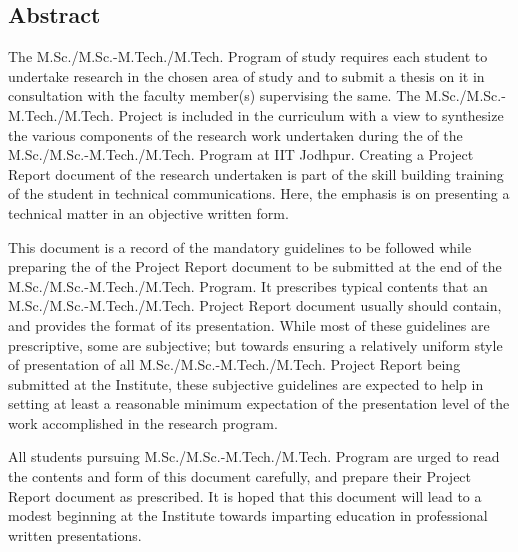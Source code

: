 \begin{flushright}
\huge{\section*{Abstract}}
\end{flushright}
The M.Sc./M.Sc.-M.Tech./M.Tech. Program of study requires each student to undertake research in the  chosen area of study and to submit a thesis on it in consultation with the faculty member(s) supervising the same. The M.Sc./M.Sc.-M.Tech./M.Tech. Project is included in the curriculum with a view to synthesize the various components of the research work undertaken during the of the M.Sc./M.Sc.-M.Tech./M.Tech. Program at IIT Jodhpur. Creating a Project Report document of the research undertaken is part of the skill building training of the student in technical communications. Here, the emphasis is on presenting a technical matter in an objective written form.

This document is a record of the mandatory guidelines to be followed while preparing the of the Project Report document to be submitted at the end of the M.Sc./M.Sc.-M.Tech./M.Tech. Program. It prescribes typical contents that an M.Sc./M.Sc.-M.Tech./M.Tech. Project Report document usually should contain, and provides the format of its presentation. While most of these guidelines are prescriptive, some are subjective; but towards ensuring a relatively uniform style of presentation of all M.Sc./M.Sc.-M.Tech./M.Tech. Project Report being submitted at the Institute, these subjective guidelines are expected to help in setting at least a reasonable minimum expectation of the presentation level of the work accomplished in the research program.

All students pursuing M.Sc./M.Sc.-M.Tech./M.Tech. Program are urged to read the contents and form of this document carefully, and prepare their Project Report document as prescribed. It is hoped that this document will lead to a modest beginning at the Institute towards imparting education in professional written presentations.

